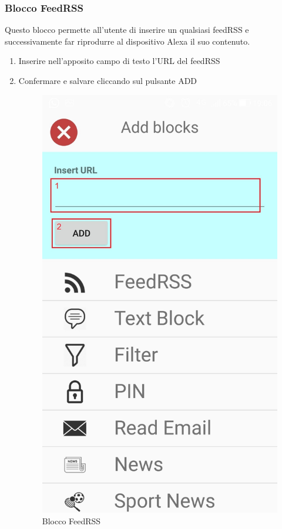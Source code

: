 \subsubsection{Blocco FeedRSS}
Questo blocco permette all'utente di inserire un qualsiasi feedRSS e successivamente far riprodurre al dispositivo Alexa il suo contenuto.
\begin{enumerate}
	\item Inserire nell'apposito campo di testo l'URL del feedRSS
	\item Confermare e salvare cliccando sul pulsante ADD
\begin{figure}[!ht]
	\centering
	\includegraphics[scale=0.2]{images/BlockFeedRSS.jpg}
	\caption{Blocco FeedRSS}
\end{figure}
\end{enumerate}

